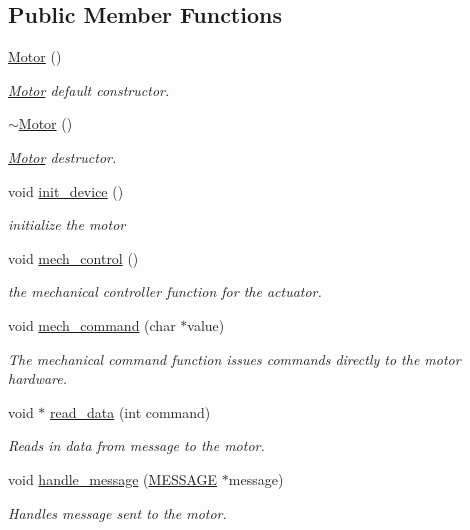 \subsection*{Public Member Functions}
\begin{DoxyCompactItemize}
\item 
\hyperlink{classMotor_af6106b4c506411265c5face762b6c004}{Motor} ()
\begin{DoxyCompactList}\small\item\em \hyperlink{classMotor}{Motor} default constructor. \end{DoxyCompactList}\item 
\hyperlink{classMotor_a2e57c7b2681efea1d3b7f253ee88ecd4}{$\sim$\-Motor} ()
\begin{DoxyCompactList}\small\item\em \hyperlink{classMotor}{Motor} destructor. \end{DoxyCompactList}\item 
void \hyperlink{classMotor_a861cd4da09dd25fc02d711a34f25a988}{init\-\_\-device} ()
\begin{DoxyCompactList}\small\item\em initialize the motor \end{DoxyCompactList}\item 
void \hyperlink{classMotor_a9902b2c030a06ca8a4e2f10c3530dbec}{mech\-\_\-control} ()
\begin{DoxyCompactList}\small\item\em the mechanical controller function for the actuator. \end{DoxyCompactList}\item 
void \hyperlink{classMotor_a3edca1dcb0f3df55eccc09ffb14426a4}{mech\-\_\-command} (char $\ast$value)
\begin{DoxyCompactList}\small\item\em The mechanical command function issues commands directly to the motor hardware. \end{DoxyCompactList}\item 
void $\ast$ \hyperlink{classMotor_a1727e2d2dfd483c9c85824915a6aeeb8}{read\-\_\-data} (int command)
\begin{DoxyCompactList}\small\item\em Reads in data from message to the motor. \end{DoxyCompactList}\item 
void \hyperlink{classMotor_add07c258d9b239633a3882a07dc9e4de}{handle\-\_\-message} (\hyperlink{SUBSYS__COMMANDS_8h_ad814416fc1a8c675bea2687d96088a8f}{M\-E\-S\-S\-A\-G\-E} $\ast$message)
\begin{DoxyCompactList}\small\item\em Handles message sent to the motor. \end{DoxyCompactList}\end{DoxyCompactItemize}
